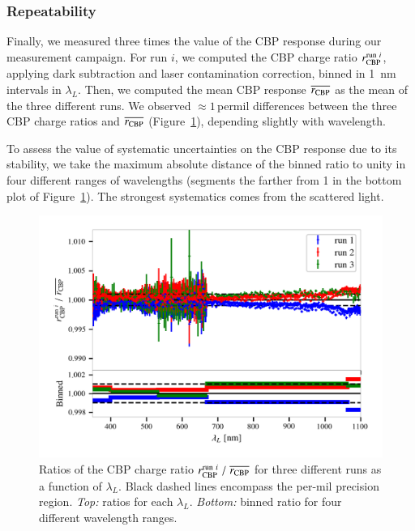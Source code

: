 

\subsubsection{Repeatability}

Finally, we measured three times the value of the CBP response during our measurement campaign. For run $i$, we computed the CBP charge ratio $r_{\rm CBP}^{\mathrm{run}\ i}$, applying dark subtraction and laser contamination correction, binned in \SI{1}{\nano\meter} intervals in $\lambda_L$. Then, we computed the mean CBP response $\overline{r_{\rm CBP}}$ as the mean of the three different runs. We observed $\approx 1$\,permil differences between the three CBP charge ratios and $\overline{r_{\rm CBP}}$ (Figure~\ref{fig:SCrepeatability}), depending slightly with wavelength.


To assess the value of systematic uncertainties on the CBP response due to its stability, we take the maximum absolute distance of the binned ratio to unity in four different ranges of wavelengths (segments the farther from 1 in the bottom plot of Figure~\ref{fig:SCrepeatability}). The strongest systematics comes from the scattered light.

\begin{figure}[h]
    \centering
    \includegraphics[width=\columnwidth]{fig/sc_runi_ratios.png}
    \caption{Ratios of the CBP charge ratio $r_{\rm CBP}^{\mathrm{run}\ i}\;/\;\overline{r_{\rm CBP}}$ for three different runs as a function of $\lambda_L$. Black dashed lines encompass the per-mil precision region. \textit{Top:} ratios for each $\lambda_L$. \textit{Bottom:} binned ratio for four different wavelength ranges.}
    \label{fig:SCrepeatability}
\end{figure}

